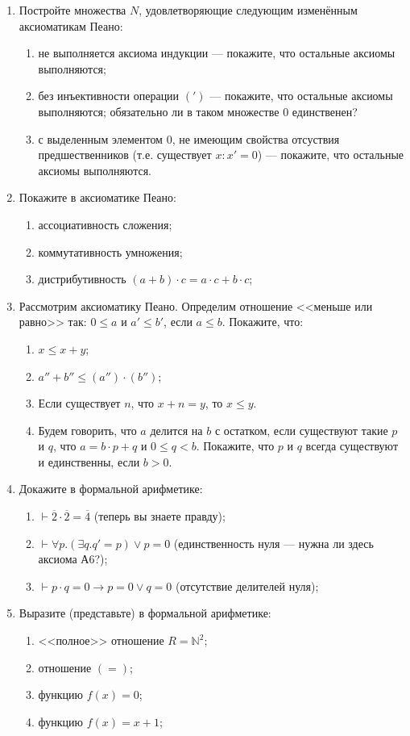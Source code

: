 \documentclass[10pt,a4paper,oneside]{article}
\begin{document}
\begin{enumerate}
\item Постройте множества $N$, удовлетворяющие следующим изменённым аксиоматикам Пеано:
\begin{enumerate}
\item не выполняется аксиома индукции --- покажите, что остальные аксиомы выполняются;
\item без инъективности операции $(')$ --- покажите, что остальные аксиомы выполняются; обязательно ли в таком множестве $0$ единственен?
\item с выделенным элементом $0$, не имеющим свойства отсуствия предшественников (т.е. существует $x: x' = 0$) --- покажите, что остальные аксиомы выполняются.
\end{enumerate}

\item Покажите в аксиоматике Пеано:
\begin{enumerate}
\item ассоциативность сложения;
\item коммутативность умножения;
\item дистрибутивность $(a + b) \cdot c = a \cdot c + b \cdot c$;
\end{enumerate}

\item Рассмотрим аксиоматику Пеано. Определим отношение <<меньше или равно>> так: $0 \le a$ и $a' \le b'$, если $a \le b$. Покажите, что:
\begin{enumerate}
\item $x \le x+y$;
\item $a'' + b'' \le (a'') \cdot (b'')$;
\item Если существует $n$, что $x + n  = y$, то $x \le y$.
\item Будем говорить, что $a$ делится на $b$ с остатком, если существуют такие $p$ и $q$, что 
$a = b \cdot p + q$ и $0 \le q < b$. Покажите, что $p$ и $q$ всегда существуют и единственны,
если $b > 0$.
\end{enumerate}

\item Докажите в формальной арифметике:
\begin{enumerate}
\item $\vdash \overline{2} \cdot \overline{2} = \overline{4}$ (теперь вы знаете правду);
\item $\vdash \forall p.(\exists q.q' = p) \vee p = 0$ (единственность нуля --- нужна ли здесь аксиома А6?);
\item $\vdash p \cdot q = 0 \rightarrow p = 0 \vee q = 0$ (отсутствие делителей нуля);
\end{enumerate}

\item Выразите (представьте) в формальной арифметике:
\begin{enumerate}
\item <<полное>> отношение $R = \mathbb{N}^2$;
\item отношение $(=)$;
\item функцию $f(x) = 0$;
\item функцию $f(x) = x + 1$;
\end{enumerate}

\end{enumerate}
\end{document}
